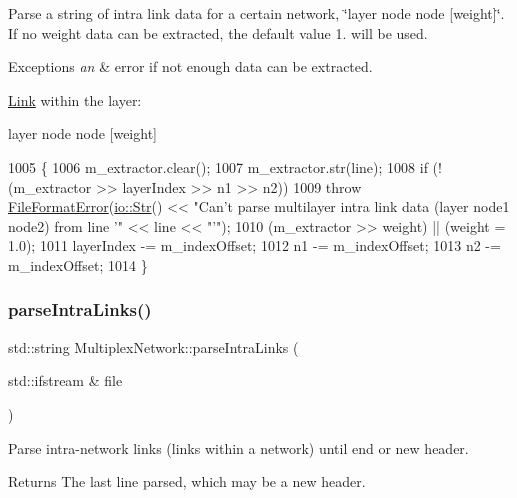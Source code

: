 Parse a string of intra link data for a certain network, \char`\"{}layer node node \mbox{[}weight\mbox{]}\char`\"{}. If no weight data can be extracted, the default value 1. will be used. 
\begin{DoxyExceptions}{Exceptions}
{\em an} & error if not enough data can be extracted.\\
\hline
\end{DoxyExceptions}
\mbox{\hyperlink{structLink}{Link}} within the layer\+:

layer node node \mbox{[}weight\mbox{]} 
\begin{DoxyCode}
1005 \{
1006     m\_extractor.clear();
1007     m\_extractor.str(line);
1008     \textcolor{keywordflow}{if} (!(m\_extractor >> layerIndex >> n1 >> n2))
1009         \textcolor{keywordflow}{throw} \mbox{\hyperlink{classFileFormatError}{FileFormatError}}(\mbox{\hyperlink{classio_1_1Str}{io::Str}}() << \textcolor{stringliteral}{"Can't parse multilayer intra link data
       (layer node1 node2) from line '"} << line << \textcolor{stringliteral}{"'"});
1010     (m\_extractor >> weight) || (weight = 1.0);
1011     layerIndex -= m\_indexOffset;
1012     n1 -= m\_indexOffset;
1013     n2 -= m\_indexOffset;
1014 \}
\end{DoxyCode}
\mbox{\label{classMultiplexNetwork_a52326c2cf646b3e15c2266270434629f}} 
\subsubsection{\texorpdfstring{parse\+Intra\+Links()}{parseIntraLinks()}}
{\footnotesize\ttfamily std\+::string Multiplex\+Network\+::parse\+Intra\+Links (\begin{DoxyParamCaption}\item[{std\+::ifstream \&}]{file }\end{DoxyParamCaption})\hspace{0.3cm}{\ttfamily [protected]}}

Parse intra-\/network links (links within a network) until end or new header. \begin{DoxyReturn}{Returns}
The last line parsed, which may be a new header. 
\end{DoxyReturn}

